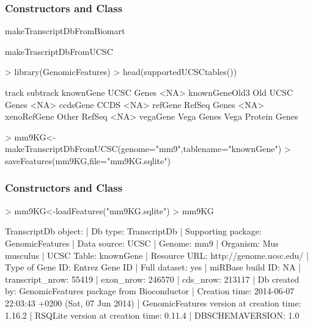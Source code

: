 \documentclass{beamer}
\begin{document}

\begin{frame}[fragile]
\frametitle{Constructors and Class}
  \bit
      \item makeTranscriptDbFromBiomart
      \item makeTrascriptDbFromUCSC
          \begin{uncoverenv}
\begin{Schunk}
\begin{Sinput}
> library(GenomicFeatures)
> head(supportedUCSCtables())
\end{Sinput}
\begin{Soutput}
                       track           subtrack
knownGene         UCSC Genes               <NA>
knownGeneOld3 Old UCSC Genes               <NA>
ccdsGene                CCDS               <NA>
refGene         RefSeq Genes               <NA>
xenoRefGene     Other RefSeq               <NA>
vegaGene          Vega Genes Vega Protein Genes
\end{Soutput}
\begin{Sinput}
> mm9KG<-makeTranscriptDbFromUCSC(genome="mm9",tablename="knownGene")
> saveFeatures(mm9KG,file="mm9KG.sqlite")
\end{Sinput}
\end{Schunk}
          \end{uncoverenv}   
  \eit
\end{frame}

\begin{frame}[fragile]
\frametitle{Constructors and Class}
          \begin{uncoverenv}
\begin{Schunk}
\begin{Sinput}
> mm9KG<-loadFeatures("mm9KG.sqlite")
> mm9KG
\end{Sinput}
\begin{Soutput}
TranscriptDb object:
| Db type: TranscriptDb
| Supporting package: GenomicFeatures
| Data source: UCSC
| Genome: mm9
| Organism: Mus musculus
| UCSC Table: knownGene
| Resource URL: http://genome.ucsc.edu/
| Type of Gene ID: Entrez Gene ID
| Full dataset: yes
| miRBase build ID: NA
| transcript_nrow: 55419
| exon_nrow: 246570
| cds_nrow: 213117
| Db created by: GenomicFeatures package from Bioconductor
| Creation time: 2014-06-07 22:03:43 +0200 (Sat, 07 Jun 2014)
| GenomicFeatures version at creation time: 1.16.2
| RSQLite version at creation time: 0.11.4
| DBSCHEMAVERSION: 1.0
\end{Soutput}
\end{Schunk}
          \end{uncoverenv}   
\end{frame}
\end{document}
